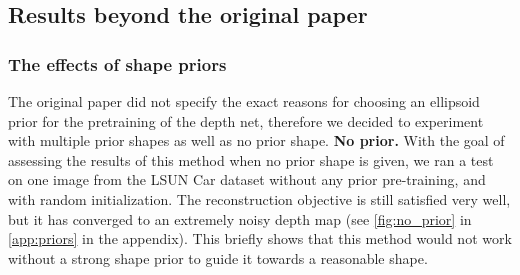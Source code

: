 \subsection{Results beyond the original paper}
\subsubsection{The effects of shape priors}
\label{sec:results_priors}
The original paper did not specify the exact reasons for choosing an ellipsoid prior for the pretraining of the depth net, therefore we decided to experiment with multiple prior shapes as well as no prior shape.
\textbf{No prior.} With the goal of assessing the results of this method when no prior shape is given, we ran a test on one image from the LSUN Car dataset without any prior pre-training, and with random initialization. The reconstruction objective is still satisfied very well, but it has converged to an extremely noisy depth map (see \autoref{fig:no_prior} in \autoref{app:priors} in the appendix). This briefly shows that this method would not work without a strong shape prior to guide it towards a reasonable shape.



